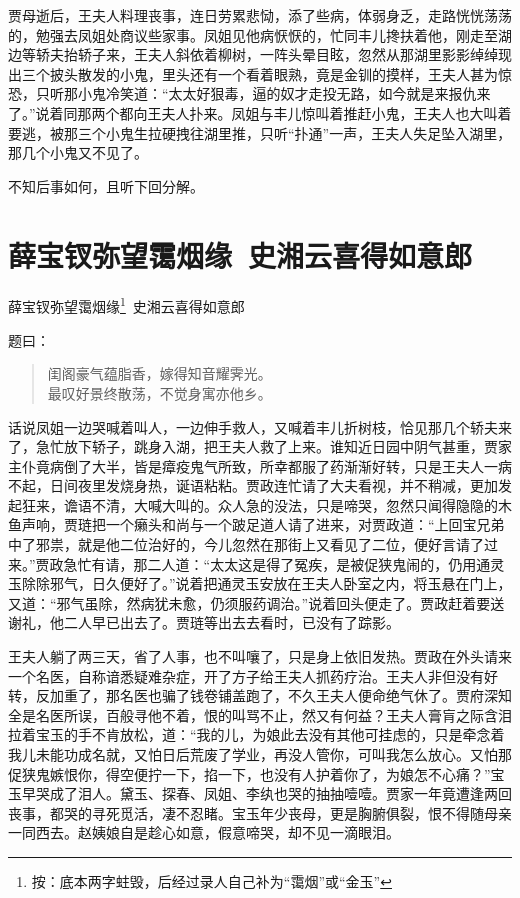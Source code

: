 \documentclass[12pt,oneside]{book}
\newenvironment{shici}{%
\begin{verse}%
\centering\large\hspace{12pt}}%
{\end{verse}}
\begin{document}
贾母逝后，王夫人料理丧事，连日劳累悲恸，添了些病，体弱身乏，走路恍恍荡荡的，勉强去凤姐处商议些家事。凤姐见他病恹恹的，忙同丰儿搀扶着他，刚走至湖边等轿夫抬轿子来，王夫人斜依着柳树，一阵头晕目眩，忽然从那湖里影影绰绰现出三个披头散发的小鬼，里头还有一个看着眼熟，竟是金钏的摸样，王夫人甚为惊恐，只听那小鬼冷笑道：“太太好狠毒，逼的奴才走投无路，如今就是来报仇来了。”说着同那两个都向王夫人扑来。凤姐与丰儿惊叫着推赶小鬼，王夫人也大叫着要逃，被那三个小鬼生拉硬拽往湖里推，只听“扑通”一声，王夫人失足坠入湖里，那几个小鬼又不见了。

不知后事如何，且听下回分解。
 
\chapter{薛宝钗弥望霭烟缘~史湘云喜得如意郎}
薛宝钗弥望霭烟缘\footnote{按：底本两字蛀毁，后经过录人自己补为“霭烟”或“金玉”}~史湘云喜得如意郎

题曰：

\begin{shici}
闺阁豪气蕴脂香，嫁得知音耀霁光。\\
最叹好景终散荡，不觉身寓亦他乡。
\end{shici}


话说凤姐一边哭喊着叫人，一边伸手救人，又喊着丰儿折树枝，恰见那几个轿夫来了，急忙放下轿子，跳身入湖，把王夫人救了上来。谁知近日园中阴气甚重，贾家主仆竟病倒了大半，皆是瘴疫鬼气所致，所幸都服了药渐渐好转，只是王夫人一病不起，日间夜里发烧身热，诞语粘粘。贾政连忙请了大夫看视，并不稍减，更加发起狂来，谵语不清，大喊大叫的。众人急的没法，只是啼哭，忽然只闻得隐隐的木鱼声响，贾琏把一个癞头和尚与一个跛足道人请了进来，对贾政道：“上回宝兄弟中了邪祟，就是他二位治好的，今儿忽然在那街上又看见了二位，便好言请了过来。”贾政急忙有请，那二人道：“太太这是得了冤疾，是被促狭鬼闹的，仍用通灵玉除除邪气，日久便好了。”说着把通灵玉安放在王夫人卧室之内，将玉悬在门上，又道：“邪气虽除，然病犹未愈，仍须服药调治。”说着回头便走了。贾政赶着要送谢礼，他二人早已出去了。贾琏等出去去看时，已没有了踪影。

王夫人躺了两三天，省了人事，也不叫嚷了，只是身上依旧发热。贾政在外头请来一个名医，自称谙悉疑难杂症，开了方子给王夫人抓药疗治。王夫人非但没有好转，反加重了，那名医也骗了钱卷铺盖跑了，不久王夫人便命绝气休了。贾府深知全是名医所误，百般寻他不着，恨的叫骂不止，然又有何益？王夫人膏肓之际含泪拉着宝玉的手不肯放松，道：“我的儿，为娘此去没有其他可挂虑的，只是牵念着我儿未能功成名就，又怕日后荒废了学业，再没人管你，可叫我怎么放心。又怕那促狭鬼嫉恨你，得空便拧一下，掐一下，也没有人护着你了，为娘怎不心痛？”宝玉早哭成了泪人。黛玉、探春、凤姐、李纨也哭的抽抽噎噎。贾家一年竟遭逢两回丧事，都哭的寻死觅活，凄不忍睹。宝玉年少丧母，更是胸腑俱裂，恨不得随母亲一同西去。赵姨娘自是趁心如意，假意啼哭，却不见一滴眼泪。
\end{document}
